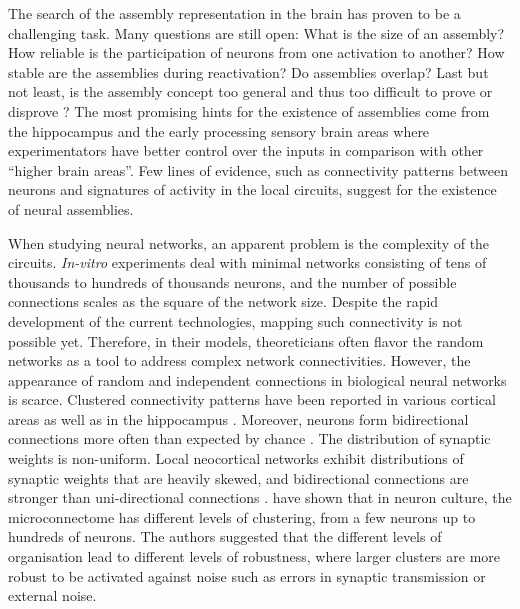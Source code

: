     The search of the assembly representation in the brain has proven to be a
    challenging task. Many questions are still open: What is the size of
    an assembly? How reliable is the participation of neurons from one
    activation to another? How stable are the assemblies during reactivation?
    Do assemblies overlap? Last but not least, is the assembly concept too
    general and thus too difficult to prove or disprove \citep{Wallace2010}?
    The most promising hints for the existence of assemblies come from the
    hippocampus and the early processing sensory brain areas where
    experimentators have better control over the inputs in comparison with
    other ``higher brain areas''. Few lines of evidence, such as connectivity
    patterns between neurons and signatures of activity in the local circuits,
    suggest for the existence of neural assemblies.
    

    When studying neural networks, an apparent problem is the complexity of the
    circuits. {\it In-vitro} experiments deal with minimal networks consisting
    of tens of thousands to hundreds of thousands neurons, and the number of
    possible connections scales as the square of the network size. Despite the
    rapid development of the current technologies, mapping such connectivity is
    not possible yet. Therefore, in their models, theoreticians often flavor the
    random networks as a tool to address complex network connectivities.
    However, the appearance of random and independent connections in biological
    neural networks is scarce. Clustered connectivity patterns have been
    reported in various cortical areas \citep{Song2005, Ko2011, Perin2011,
    Shimono2015} as well as in the hippocampus \citep{Takahashi2010,
    Guzman2016}. Moreover, neurons form bidirectional connections more often
    than expected by chance \citep{Markram1997, Song2005, Takahashi2010,
    Ko2011, Perin2011}. The distribution of synaptic weights is non-uniform.
    Local neocortical networks exhibit distributions of synaptic weights that
    are heavily skewed, and bidirectional connections are stronger than
    uni-directional connections \citep{Markram1997, Song2005, Buzsaki2014}.
    \cite{Shimono2015} have shown that in neuron culture, the microconnectome
    has different levels of clustering, from a few neurons up to hundreds of
    neurons. The authors suggested that the different levels of organisation
    lead to different levels of robustness, where larger clusters are more
    robust to be activated against noise such as errors in synaptic
    transmission or external noise.

